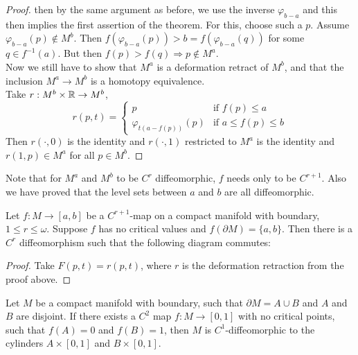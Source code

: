 \begin{proof}
   then by the same argument as before, we use the inverse $\varphi_{b-a}$ and
   this then implies the first assertion of the theorem. For this, choose such a
   $p$. Assume $\varphi_{b-a}(p) \notin M^b$. Then 
   $f(\varphi_{b-a}(p)) > b = f(\varphi_{b-a}(q))$ for some $q \in f^{-1}(a)$.
   But then $f(p) > f(q) \Rightarrow p \notin M^a$. \\
   Now we still have to show that $M^a$ is a deformation retract of $M^b$, and 
   that the inclusion $M^a \rightarrow M^b$ is a homotopy equivalence. \\
   Take $r: M^b \times {\mathbb R} \rightarrow M^b$, 
   \[ 
      r(p, t) = \begin{cases}
         p & \text{if } f(p) \leq a \\
         \varphi_{t(a - f(p))}(p) & \text{if } a \leq f(p) \leq b
      \end{cases}
   \]
   Then $r(\cdot, 0)$ is the identity and $r(\cdot, 1)$ restricted to $M^a$ is
   the identity and $r(1, p) \in M^a$ for all $p \in M^b$. 
\end{proof}

\begin{remark}
   Note that for $M^a$ and $M^b$ to be $C^r$ diffeomorphic, $f$ needs only to be
   $C^{r+1}$. Also we have proved that the level sets between $a$ and $b$ are
   all diffeomorphic.
\end{remark}

\begin{corollary}[Hirsch]
   Let $f: M \rightarrow [a, b]$ be a $C^{r+1}$-map on a compact manifold with 
   boundary, $1 \leq r \leq \omega$. Suppose $f$ has no critical values and 
   $f(\partial M) = \{a, b\}$. Then there is a $C^r$ diffeomorphism such that the 
   following diagram commutes:
   \begin{figure}[H]
      \centering
   \end{figure}
\end{corollary}

\begin{proof}
   Take $F(p,t) = r(p, t)$, where $r$ is the deformation retraction from the 
   proof above.
\end{proof}

\begin{corollary}[Hirsch]
   Let $M$ be a compact manifold with boundary, such that $\partial M = A \cup B$
   and $A$ and $B$ are disjoint. If there exists a $C^2$ map $f: M \rightarrow [0,1]$
   with no critical points, such that $f(A) = 0$ and $f(B) = 1$, then $M$ is 
   $C^1$-diffeomorphic to the cylinders $A \times [0, 1]$ and $B \times [0, 1]$.
\end{corollary}
